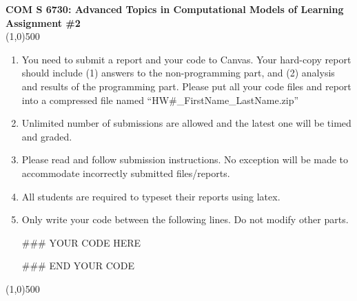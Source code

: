 \documentclass[11pt]{article}
\begin{document}
\begin{center}
{\Large \textbf{COM S 6730: Advanced Topics in Computational Models of Learning\\
Assignment \#2}}\\
\linethickness{1mm}\line(1,0){500}\\
\begin{enumerate}
    \item You need to submit a report and your code to
    Canvas. Your hard-copy report should include (1) answers to the
    non-programming part, and (2) analysis and results of the
    programming part. Please put all your code files and report into a compressed file
    named ``HW\#\_FirstName\_LastName.zip''
    \item Unlimited number of submissions are allowed and the latest one will be timed and graded.
    \item Please read and follow submission instructions. No exception will be made to accommodate incorrectly submitted files/reports.
    \item All students are required to typeset their reports using latex.
    \item Only write your code between the following lines. Do not modify other parts.

\#\#\# YOUR CODE HERE

\#\#\# END YOUR CODE
\end{enumerate}
\end{center}
\linethickness{1mm}\line(1,0){500}


\end{document}
